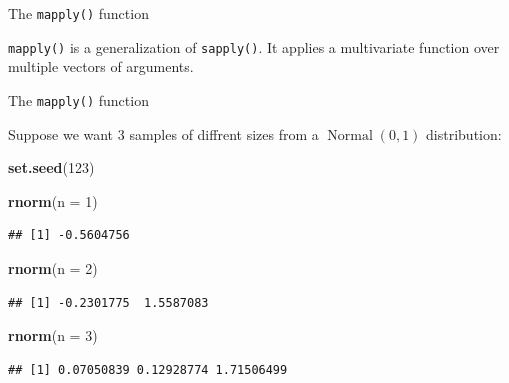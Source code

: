 \documentclass[ignorenonframetext,]{beamer}
\newenvironment{Shaded}{\begin{snugshade}}{\end{snugshade}}
\newcommand{\DataTypeTok}[1]{\textcolor[rgb]{0.13,0.29,0.53}{#1}}
\newcommand{\DecValTok}[1]{\textcolor[rgb]{0.00,0.00,0.81}{#1}}
\newcommand{\KeywordTok}[1]{\textcolor[rgb]{0.13,0.29,0.53}{\textbf{#1}}}
\newcommand{\NormalTok}[1]{#1}
\begin{document}
\begin{frame}[fragile]{The \texttt{mapply()} function}
\protect\hypertarget{the-mapply-function}{}

\texttt{mapply()} is a generalization of \texttt{sapply()}. It applies a
multivariate function over multiple vectors of arguments.

\end{frame}

\begin{frame}[fragile]{The \texttt{mapply()} function}
\protect\hypertarget{the-mapply-function-1}{}

Suppose we want 3 samples of diffrent sizes from a
\(\operatorname{Normal}(0, 1)\) distribution:

\begin{Shaded}
\begin{Highlighting}[]
\KeywordTok{set.seed}\NormalTok{(}\DecValTok{123}\NormalTok{)}

\KeywordTok{rnorm}\NormalTok{(}\DataTypeTok{n =} \DecValTok{1}\NormalTok{)}
\end{Highlighting}
\end{Shaded}

\begin{verbatim}
## [1] -0.5604756
\end{verbatim}

\begin{Shaded}
\begin{Highlighting}[]
\KeywordTok{rnorm}\NormalTok{(}\DataTypeTok{n =} \DecValTok{2}\NormalTok{)}
\end{Highlighting}
\end{Shaded}

\begin{verbatim}
## [1] -0.2301775  1.5587083
\end{verbatim}

\begin{Shaded}
\begin{Highlighting}[]
\KeywordTok{rnorm}\NormalTok{(}\DataTypeTok{n =} \DecValTok{3}\NormalTok{)}
\end{Highlighting}
\end{Shaded}

\begin{verbatim}
## [1] 0.07050839 0.12928774 1.71506499
\end{verbatim}

\end{frame}
\end{document}
